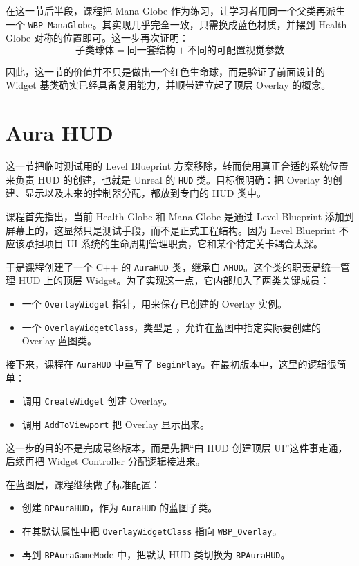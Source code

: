 在这一节后半段，课程把 Mana Globe 作为练习，让学习者用同一个父类再派生一个 \texttt{WBP\_ManaGlobe}。其实现几乎完全一致，只需换成蓝色材质，并摆到 Health Globe 对称的位置即可。这一步再次证明：
\[
\text{子类球体} = \text{同一套结构} + \text{不同的可配置视觉参数}
\]

因此，这一节的价值并不只是做出一个红色生命球，而是验证了前面设计的 Widget 基类确实已经具备复用能力，并顺带建立起了顶层 Overlay 的概念。

\section{Aura HUD}

这一节把临时测试用的 Level Blueprint 方案移除，转而使用真正合适的系统位置来负责 HUD 的创建，也就是 Unreal 的 \texttt{HUD} 类。目标很明确：把 Overlay 的创建、显示以及未来的控制器分配，都放到专门的 HUD 类中。

课程首先指出，当前 Health Globe 和 Mana Globe 是通过 Level Blueprint 添加到屏幕上的，这显然只是测试手段，而不是正式工程结构。因为 Level Blueprint 不应该承担项目 UI 系统的生命周期管理职责，它和某个特定关卡耦合太深。

于是课程创建了一个 C++ 的 \texttt{AuraHUD} 类，继承自 \texttt{AHUD}。这个类的职责是统一管理 HUD 上的顶层 Widget。为了实现这一点，它内部加入了两类关键成员：
\begin{itemize}
	\item 一个 \texttt{OverlayWidget} 指针，用来保存已创建的 Overlay 实例。
	\item 一个 \texttt{OverlayWidgetClass}，类型是 ，允许在蓝图中指定实际要创建的 Overlay 蓝图类。
\end{itemize}

接下来，课程在 \texttt{AuraHUD} 中重写了 \texttt{BeginPlay}。在最初版本中，这里的逻辑很简单：
\begin{itemize}
	\item 调用 \texttt{CreateWidget} 创建 Overlay。
	\item 调用 \texttt{AddToViewport} 把 Overlay 显示出来。
\end{itemize}

这一步的目的不是完成最终版本，而是先把“由 HUD 创建顶层 UI”这件事走通，后续再把 Widget Controller 分配逻辑接进来。

在蓝图层，课程继续做了标准配置：
\begin{itemize}
	\item 创建 \texttt{BPAuraHUD}，作为 \texttt{AuraHUD} 的蓝图子类。
	\item 在其默认属性中把 \texttt{OverlayWidgetClass} 指向 \texttt{WBP\_Overlay}。
	\item 再到 \texttt{BPAuraGameMode} 中，把默认 HUD 类切换为 \texttt{BPAuraHUD}。
\end{itemize}

